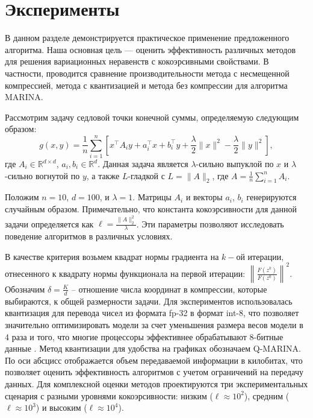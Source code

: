 \documentclass{ProcISPRAS}
\begin{document}
\section{Эксперименты}

В данном разделе демонстрируется практическое применение предложенного алгоритма. Наша основная цель — оценить эффективность различных методов для решения вариационных неравенств с кокоэрсивными свойствами. 
В частности, проводится сравнение производительности метода с несмещенной компрессией, метода с квантизацией \cite{jacob2018quantization} и метода без компрессии для алгоритма \textsc{MARINA}.

Рассмотрим задачу седловой точки конечной суммы, определяемую следующим образом:
\[
    g(x, y) = \frac{1}{n} \sum_{i=1}^n \left[x^\top A_i y + a_i^\top x + b_i^\top y + \frac{\lambda}{2} \|x\|^2 - \frac{\lambda}{2} \|y\|^2\right],
\]
где $A_i \in \mathbb{R}^{d \times d}$, $a_i, b_i \in \mathbb{R}^d$. Данная задача является $\lambda$-сильно выпуклой по $x$ и $\lambda$-сильно вогнутой по $y$, а также $L$-гладкой с $L = \|A\|_2$, где $A = \frac{1}{n} \sum_{i=1}^n A_i$.

Положим $n = 10$, $d = 100$, и $\lambda = 1$. Матрицы $A_i$ и векторы $a_i$, $b_i$ генерируются случайным образом. Примечательно, что константа кокоэрсивности для данной задачи определяется как $\ell = \frac{\|A\|_2^2}{\lambda}$. Эти параметры позволяют исследовать поведение алгоритмов в различных условиях.

В качестве критерия возьмем квадрат нормы градиента на $k-$ой итерации, отнесенного к квадрату нормы функционала на первой итерации: $\left\|\frac{F(z^k)}{F(z^0)}\right\|^2$. Обозначим $\delta = \frac{K}{d}$ -- отношение числа координат в компрессии, которые выбираются, к общей размерности задачи. Для экспериментов использовалась квантизация для перевода чисел из формата fp-32 в формат int-8, что позволяет значительно оптимизировать модели за счет уменьшения размера весов модели в 4 раза и того, что многие процессоры эффективнее обрабатывают 8-битные данные \cite{krishnamoorthi2018quantizing, wu2020integer}. Метод квантизации для удобства на графиках обозначаем \textsc{Q-MARINA}. По оси абсцисс отображается объем передаваемой информации в килобитах, что позволяет оценить эффективность алгоритмов с учетом ограничений на передачу данных. 
Для комплексной оценки методов проектируются три экспериментальных сценария с разными уровнями кокоэрсивности: низким ($\ell \approx 10^2$), средним ($\ell \approx 10^3$) и высоким ($\ell \approx 10^4$).
\end{document}
